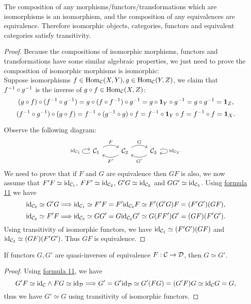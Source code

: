 \documentclass{article}
\begin{document}
\begin{thm}\label{transitivity}
	The composition of any morphisms/functors/transformations which are isomorphisms is an isomorphism, and the composition of any equivalences are equivalence. Therefore isomorphic objects, categories, functors and equivalent categories satisfy transitivity.
\end{thm}

\begin{proof}
	Because the compositions of isomorphic morphisms, functors and transformations have some similar algebraic properties, we just need to prove the composition of isomorphic morphisms is isomorphic:\\
	Suppose isomorphisms $f\in\mathrm{Hom}_{\mathcal{C}}(X,Y),g\in\mathrm{Hom}_{\mathcal{C}}(Y,Z)$, we claim that $f^{-1}\circ g^{-1}$ is the inverse of $g\circ f\in\mathrm{Hom}_{\mathcal{C}}(X,Z)$:
		$$(g\circ f)\circ(f^{-1}\circ g^{-1})=g\circ(f\circ f^{-1})\circ g^{-1}=g\circ\mathbf{1}_Y
		\circ g^{-1}=g\circ g^{-1}=\mathbf{1}_Z,$$
		$$(f^{-1}\circ g^{-1})\circ(g\circ f)=f^{-1}\circ(g^{-1}\circ g)\circ f=f^{-1}\circ\mathbf{1}_Y
		\circ f=f^{-1}\circ f=\mathbf{1}_X.$$
	
	Observe the following diagram:
	\[\begin{tikzcd}
			\C_1\arrow[loop left, "\id_{\C_1}"]\arrow[bend left=30, r, "F"] &
			\C_2 \arrow[bend left=30, l, "F'"] \arrow[bend left=30, r, "G"] &
			\C_3 \arrow[bend left=30, l, "G'"] \arrow[loop right, "\id_{\C_3}."]
		\end{tikzcd}\]
	We need to prove that if $F$ and $G$ are equivalence then $GF$ is also, we now assume that $F'F\simeq\mathrm{id}_{\mathcal{C}_1}$, $FF'\simeq\mathrm{id}_{\mathcal{C}_2}$, $G'G\simeq\mathrm{id}_{\mathcal{C}_2}$ and $GG'\simeq\mathrm{id}_{\mathcal{C}_3}$. Using \hyperref[6]{formula 11} we have
	$$\mathrm{id}_{\mathcal{C}_2}\simeq G'G\Longrightarrow\mathrm{id}_{\mathcal{C}_1}\simeq F'F=F'\mathrm{id}_{\mathcal{C}_2}F\simeq F'(G'G)F=(F'G')(GF),$$
	$$\mathrm{id}_{\mathcal{C}_2}\simeq F'F\Longrightarrow\mathrm{id}_{\mathcal{C}_3}\simeq GG'=G\mathrm{id}_{\mathcal{C}_2}G'\simeq G(FF')G'=(GF)(F'G').$$
	Using transitivity of isomorphic functors, we have $\mathrm{id}_{\mathcal{C}_1}\simeq(F'G')(GF)$ and $\mathrm{id}_{\mathcal{C}_3}\simeq(GF)(F'G')$. Thus $GF$ is equivalence.
\end{proof}


\begin{cor}
	If functors $G,G'$ are quasi-inverses of equivalence $F:\mathcal{C}\to\mathcal{D}$, then $G\simeq G'$.
\end{cor}

\begin{proof}
	Using \hyperref[6]{formula 11}, we have
	\[G'F\simeq\mathrm{id}_{\mathcal{C}}\wedge FG\simeq\mathrm{id}_{\mathcal{D}}\Longrightarrow G'=G'\mathrm{id}_{\mathcal{D}}\simeq G'(FG)=(G'F)G\simeq\mathrm{id}_{\mathcal{C}} G=G,\]
	thus we have $G'\simeq G$ using transitivity of isomorphic functors.
\end{proof}
\end{document}
